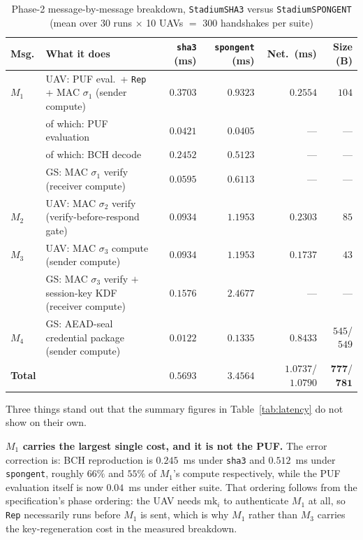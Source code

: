 \documentclass[11pt,a4paper]{article}
\begin{document}
\begin{table}[H]
\centering
\caption{Phase-2 message-by-message breakdown, \texttt{StadiumSHA3} versus
\texttt{StadiumSPONGENT} (mean over 30 runs $\times$ 10 UAVs $=$ 300 handshakes
per suite)}
\label{tab:msgbreakdown}
\small
\begin{tabular}{@{}p{1.1cm}p{5.0cm}rrrr@{}}
\toprule
\textbf{Msg.} & \textbf{What it does} & \textbf{\texttt{sha3} (ms)} &
\textbf{\texttt{spongent} (ms)} & \textbf{Net.\ (ms)} & \textbf{Size (B)} \\
\midrule
$M_1$ & UAV: PUF eval.\ + \texttt{Rep} + MAC $\sigma_1$ (sender compute) & $0.3703$ & $0.9323$ & $0.2554$ & $104$ \\
      & \quad of which: PUF evaluation & $0.0421$ & $0.0405$ & --- & --- \\
      & \quad of which: BCH decode & $0.2452$ & $0.5123$ & --- & --- \\
      & GS: MAC $\sigma_1$ verify (receiver compute) & $0.0595$ & $0.6113$ & --- & --- \\
$M_2$ & UAV: MAC $\sigma_2$ verify (verify-before-respond gate) & $0.0934$ & $1.1953$ & $0.2303$ & $85$ \\
$M_3$ & UAV: MAC $\sigma_3$ compute (sender compute) & $0.0934$ & $1.1953$ & $0.1737$ & $43$ \\
      & GS: MAC $\sigma_3$ verify $+$ session-key KDF (receiver compute) & $0.1576$ & $2.4677$ & --- & --- \\
$M_4$ & GS: AEAD-seal credential package (sender compute) & $0.0122$ & $0.1335$ & $0.8433$ & $545$/$549$ \\
\midrule
\textbf{Total} & & $\mathbf{0.5693}$ & $\mathbf{3.4564}$ & $\mathbf{1.0737}$/$\mathbf{1.0790}$ & $\mathbf{777}$/$\mathbf{781}$ \\
\bottomrule
\end{tabular}
\end{table}

Three things stand out that the summary figures in Table~\ref{tab:latency}
do not show on their own.

\textbf{$M_1$ carries the largest single cost, and it is not the PUF.} The error
correction is: BCH reproduction is $0.245$~ms under \texttt{sha3} and
$0.512$~ms under \texttt{spongent}, roughly $66\%$ and $55\%$ of $M_1$'s compute
respectively, while the PUF evaluation itself is now $0.04$~ms under either suite.
That ordering follows from the specification's phase ordering: the UAV needs
$\text{mk}_i$ to authenticate $M_1$ at all, so \texttt{Rep} necessarily runs before
$M_1$ is sent, which is why $M_1$ rather than $M_3$ carries the key-regeneration
cost in the measured breakdown.
\end{document}
